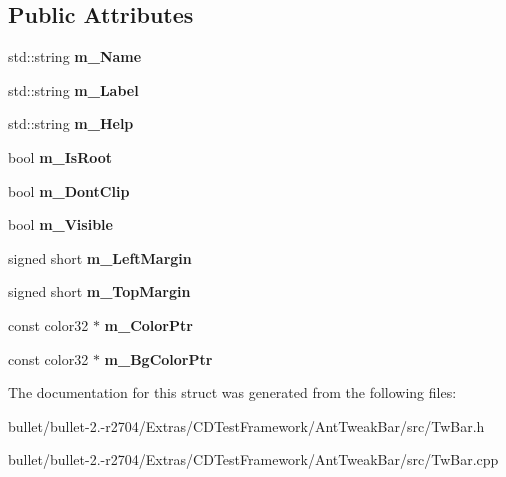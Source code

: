 \subsection*{Public Attributes}
\begin{DoxyCompactItemize}
\item 
\hypertarget{struct_c_tw_var_aa33dc96994a21e7acd40b6a9065977ed}{std\+::string {\bfseries m\+\_\+\+Name}}\label{struct_c_tw_var_aa33dc96994a21e7acd40b6a9065977ed}

\item 
\hypertarget{struct_c_tw_var_a6d6ab383a409f05e696fcd56ab5ba9ae}{std\+::string {\bfseries m\+\_\+\+Label}}\label{struct_c_tw_var_a6d6ab383a409f05e696fcd56ab5ba9ae}

\item 
\hypertarget{struct_c_tw_var_a9b590dda54bb4970aaacfdcffb6b8e43}{std\+::string {\bfseries m\+\_\+\+Help}}\label{struct_c_tw_var_a9b590dda54bb4970aaacfdcffb6b8e43}

\item 
\hypertarget{struct_c_tw_var_ada5e998f9a6e5d31ef03c759c38e7776}{bool {\bfseries m\+\_\+\+Is\+Root}}\label{struct_c_tw_var_ada5e998f9a6e5d31ef03c759c38e7776}

\item 
\hypertarget{struct_c_tw_var_a13909bcd428a493cb0129edb23403395}{bool {\bfseries m\+\_\+\+Dont\+Clip}}\label{struct_c_tw_var_a13909bcd428a493cb0129edb23403395}

\item 
\hypertarget{struct_c_tw_var_afdaf6d69fd0704b73496ad51a33d9602}{bool {\bfseries m\+\_\+\+Visible}}\label{struct_c_tw_var_afdaf6d69fd0704b73496ad51a33d9602}

\item 
\hypertarget{struct_c_tw_var_a2eb6fc5bb3e7a4b1b7c73a5cbdff35f2}{signed short {\bfseries m\+\_\+\+Left\+Margin}}\label{struct_c_tw_var_a2eb6fc5bb3e7a4b1b7c73a5cbdff35f2}

\item 
\hypertarget{struct_c_tw_var_a337f169e917865761c1c9394f57994b7}{signed short {\bfseries m\+\_\+\+Top\+Margin}}\label{struct_c_tw_var_a337f169e917865761c1c9394f57994b7}

\item 
\hypertarget{struct_c_tw_var_a0750958d860f3cc2752914ac143e56e7}{const color32 $\ast$ {\bfseries m\+\_\+\+Color\+Ptr}}\label{struct_c_tw_var_a0750958d860f3cc2752914ac143e56e7}

\item 
\hypertarget{struct_c_tw_var_aef2163c6e40c68c52c67eaf8d3666c09}{const color32 $\ast$ {\bfseries m\+\_\+\+Bg\+Color\+Ptr}}\label{struct_c_tw_var_aef2163c6e40c68c52c67eaf8d3666c09}

\end{DoxyCompactItemize}


The documentation for this struct was generated from the following files\+:\begin{DoxyCompactItemize}
\item 
bullet/bullet-\/2.-\/r2704/\+Extras/\+C\+D\+Test\+Framework/\+Ant\+Tweak\+Bar/src/Tw\+Bar.\+h\item 
bullet/bullet-\/2.-\/r2704/\+Extras/\+C\+D\+Test\+Framework/\+Ant\+Tweak\+Bar/src/Tw\+Bar.\+cpp\end{DoxyCompactItemize}
